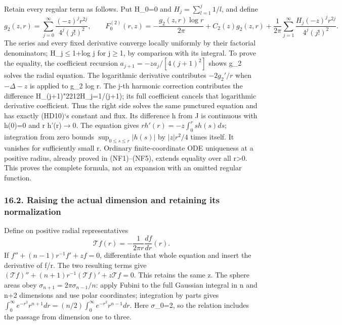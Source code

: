 \documentclass[
  11pt,
]{article}
\begin{document}
Retain every regular term as follows. Put H\_0=0 and
\(H_j=\sum_{l=1}^j1/l\), and define \[
g_2(z,r)=\sum_{j=0}^\infty
                 \frac{(-z)^jr^{2j}}{4^j(j!)^2},\qquad
F_0^{(2)}(r,z)
=-\frac{g_2(z,r)\log r}{2\pi}+C_2(z)g_2(z,r)
 +\frac1{2\pi}\sum_{j=1}^\infty
                 \frac{H_j(-z)^jr^{2j}}{4^j(j!)^2}.
\tag{HD11}
\] The series and every fixed derivative converge locally uniformly by
their factorial denominators; H\_j\ensuremath{\leq}1+log j for j\ensuremath{\geq}1, by comparison with
its integral. To prove the equality, the coefficient recursion
\(a_{j+1}=-za_j/[4(j+1)^2]\) shows g\_2 solves the radial equation. The
logarithmic derivative contributes \(-2g_2'/r\) when \(-\Delta-z\) is
applied to g\_2 log r. The j-th harmonic correction contributes the
difference H\_(j+1){\ReaderSymbols\char"2212}H\_j=1/(j+1); its full coefficient cancels that
logarithmic derivative coefficient. Thus the right side solves the same
punctured equation and has exactly (HD10)`s constant and flux. Its
difference h from J is continuous with h(0)=0 and r h'(r)\ensuremath{\to}0. The
equation gives \(r h'(r)=-z\int_0^r s h(s)ds\); integration from zero
bounds \(\sup_{0\leq s\leq r}|h(s)|\) by \(|z|r^2/4\) times itself. It
vanishes for sufficiently small r. Ordinary finite-coordinate ODE
uniqueness at a positive radius, already proved in (NF1)--(NF5), extends
equality over all r\textgreater0. This proves the complete formula, not
an expansion with an omitted regular function.

\subsubsection{16.2. Raising the actual dimension and retaining its
normalization}\label{raising-the-actual-dimension-and-retaining-its-normalization}

Define on positive radial representatives \[
\mathcal T f(r)=-\frac1{2\pi r}\frac{df}{dr}(r).
\tag{HD12}
\] If \(f''+(n-1)r^{-1}f'+zf=0\), differentiate that whole equation and
insert the derivative of f/r. The two resulting terms give
\((\mathcal Tf)''+(n+1)r^{-1}(\mathcal Tf)'+z\mathcal Tf=0\). This
retains the same z. The sphere areas obey
\(\sigma_{n+1}=2\pi\sigma_{n-1}/n\): apply Fubini to the full Gaussian
integral in n and n+2 dimensions and use polar coordinates; integration
by parts gives
\(\int_0^\infty e^{-r^2}r^{n+1}dr=(n/2)\int_0^\infty e^{-r^2}r^{n-1}dr\).
Here \ensuremath{\sigma}\_0=2, so the relation includes the passage from dimension one to
three.
\end{document}

